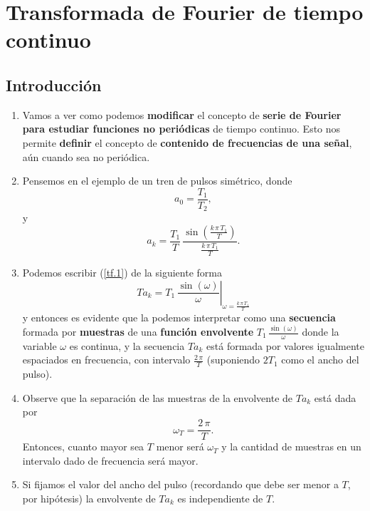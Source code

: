 \documentclass[11pt,a4paper,openany]{book}
\begin{document}
\chapter{Transformada de Fourier de tiempo continuo}

\section{Introducción}

\begin{enumerate}
	
	\item Vamos a ver como podemos \textbf{modificar} el concepto de \textbf{serie de Fourier} \textbf{para estudiar funciones no periódicas} de tiempo continuo. Esto nos permite \textbf{definir} el concepto de \textbf{contenido de frecuencias de una señal}, aún cuando sea no periódica.
	
	\item Pensemos en el ejemplo de un tren de pulsos simétrico, donde
	\begin{equation}
		a_{0} = \frac{T_{1}}{T_{2}},
	\end{equation}
	y
	\begin{equation}
		a_{k} = \frac{T_{1}}{T} \, \frac{\sin\left(\frac{k \, \pi \, T_{1}}{T}\right)}{\frac{k \, \pi \, T_{1}}{T}}. \label{tf.1}
	\end{equation}
	
	\item Podemos escribir (\ref{tf.1}) de la siguiente forma
	\begin{equation}
		T a_{k} = \left. T_{1} \, \frac{\sin(\omega)}{\omega} \right|_{\omega = \frac{k \, \pi \, T_{1}}{T}}
	\end{equation}
	y entonces es evidente que la podemos interpretar como una \textbf{secuencia} formada por \textbf{muestras} de una \textbf{función envolvente} $T_{1} \, \frac{\sin(\omega)}{\omega}$ donde la variable $\omega$ es continua, y la secuencia $T a_{k}$ está formada por valores igualmente espaciados en frecuencia, con intervalo $\frac{2 \, \pi}{T}$ (suponiendo $2T_1$ como el ancho del pulso).
	
	\item Observe que la separación de las muestras de la envolvente de $T a_{k}$ está dada por 
	\begin{equation}
		\omega_{T} = \frac{2 \, \pi}{T}.
	\end{equation}
	Entonces, cuanto mayor sea $T$ menor será $\omega_{T}$ y la cantidad de muestras en un intervalo dado de frecuencia será mayor.
	
	\item Si fijamos el valor del ancho del pulso (recordando que debe ser menor a $T$, por hipótesis) la envolvente de $T a_{k}$ es independiente de $T$.
	
\end{enumerate}
\end{document}
